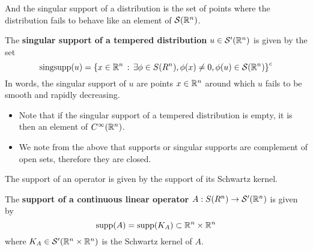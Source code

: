 \documentclass[12pt]{article}
\begin{document}
And the singular support of a distribution is the set of points where the distribution fails to behave like an element of $\mathcal{S}({\mathbb R}^n)$. 
\begin{fdefinition}
    The \textbf{singular support of a tempered distribution} $ u \in \mathcal{S}'({\mathbb R}^n)$ is given by the set 
    \[
    \mathrm{sing supp}(u) = \left\{x \in {\ensuremath {\mathbb R}}^n \, : \, \exists \phi \in S(R^n), \phi(x) \neq 0, \phi(u) \in \mathcal{S}({\mathbb R}^n)\right\}^c
    \]
    In words, the singular support of $u$ are points $x \in {\ensuremath {\mathbb R}}^n$ around which $u$ fails to be smooth and rapidly decreasing. 
\end{fdefinition}
\begin{rem} \hfill 
    \begin{itemize}
        \item     Note that if the singular support of a tempered distribution is empty, it is then an element of $C^\infty({\mathbb R}^n)$.     
        \item We note from the above that supports or singular supports are complement of open sets, therefore they are closed. 
    \end{itemize}

\end{rem}

The support of an operator is given by the support of its Schwartz kernel. 
\begin{fdefinition}
    The \textbf{support of a continuous linear operator} $A: S(R^n) \to \mathcal{S}'({\mathbb R}^n)$ is given by 
    \[
    \mathrm{supp}(A) = \mathrm{supp}(K_A) \subset {\ensuremath {\mathbb R}}^n \times {\ensuremath {\mathbb R}}^n
    \]
    where $K_A \in \mathcal{S}'({\mathbb R}^n \times {\ensuremath {\mathbb R}}^n)$ is the Schwartz kernel of $A$. 
\end{fdefinition}


%
%
%
\end{document}
